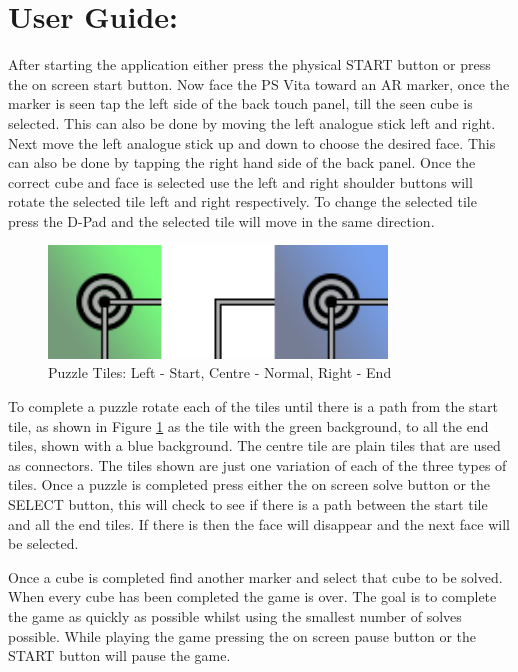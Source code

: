 \section{User Guide:}\label{sc:userguide}

After starting the application either press the physical START button or press the on screen start button.
Now face the PS Vita toward an AR marker, once the marker is seen tap the left side of the back touch panel, till the seen cube is selected.
This can also be done by moving the left analogue stick left and right.
Next move the left analogue stick up and down to choose the desired face.
This can also be done by tapping the right hand side of the back panel.
Once the correct cube and face is selected use the left and right shoulder buttons will rotate the selected tile left and right respectively.
To change the selected tile press the D-Pad and the selected tile will move in the same direction. 

\begin{figure}[ht!]
	\centering
	\includegraphics[width=90mm]{images/tiles.png}
	\caption{Puzzle Tiles: Left - Start, Centre - Normal, Right - End}
	\label{fig:tiles}
\end{figure}

To complete a puzzle rotate each of the tiles until there is a path from the start tile, as shown in Figure \ref{fig:tiles} as the tile with the green background, to all the end tiles, shown with a blue background.
The centre tile are plain tiles that are used as connectors.
The tiles shown are just one variation of each of the three types of tiles.
Once a puzzle is completed press either the on screen solve button or the SELECT button, this will check to see if there is a path between the start tile and all the end tiles.
If there is then the face will disappear and the next face will be selected. 

Once a cube is completed find another marker and select that cube to be solved.
When every cube has been completed the game is over.
The goal is to complete the game as quickly as possible whilst using the smallest number of solves possible.
While playing the game pressing the on screen pause button or the START button will pause the game.
